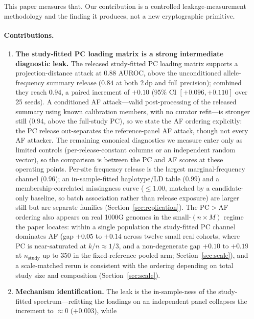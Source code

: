 \documentclass[11pt]{article}
\begin{document}
This paper measures that. Our contribution is a controlled
leakage-measurement methodology and the finding it produces, not a new
cryptographic primitive.

\paragraph{Contributions.}
\begin{enumerate}
  \item \textbf{The study-fitted PC loading matrix is a strong intermediate
  diagnostic leak.} The released
  study-fitted PC loading matrix supports a projection-distance attack at $0.88$
  AUROC, above the unconditioned allele-frequency summary release ($0.84$ at both
  2\,dp and full precision); combined they reach $0.94$, a paired increment of
  $+0.10$ (95\% CI $[+0.096,+0.110]$ over 25 seeds). A conditioned AF
  attack---valid post-processing of the released summary using known calibration
  members, with no curator refit---is stronger still ($0.94$, above the
  full-study PC), so we state the AF ordering explicitly: the PC release
  out-separates the reference-panel AF attack, though not every AF attacker. The
  remaining canonical diagnostics
  we measure enter only as limited controls (per-release-constant columns or an
  independent random vector), so the comparison is between the PC and AF scores
  at these operating points. Per-site frequency release is the largest
  marginal-frequency channel ($0.96$); an in-sample-fitted haplotype/LD table
  ($0.99$) and a membership-correlated missingness curve ($\le 1.00$, matched by
  a candidate-only baseline, so batch association rather than release exposure)
  are larger still but are
  separate families (Section~\ref{sec:replication}).
  The PC$>$AF ordering also appears on real 1000G genomes in the small-$(n{\times}M)$
  regime the paper locates: within a single population the
  study-fitted PC channel dominates AF (gap $+0.05$ to $+0.14$ across twelve
  small real cohorts, where PC is near-saturated at $k/n{\approx}1/3$, and a
  non-degenerate gap $+0.10$ to $+0.19$ at $n_{\text{study}}$ up to
  $350$ in the fixed-reference pooled arm; Section~\ref{sec:scale}), and a
  scale-matched rerun is consistent with
  the ordering depending on total study size and composition
  (Section~\ref{sec:scale}).
  \item \textbf{Mechanism identification.} The leak is the in-sample-ness of the
  study-fitted spectrum---refitting the loadings on an independent panel
  collapses the increment to $\approx 0$ ($+0.003$), while

\end{enumerate}
\end{document}
